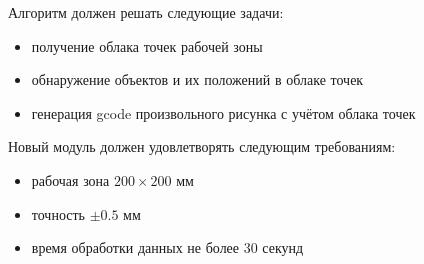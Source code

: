 Алгоритм должен решать следующие задачи:
\begin{itemize}
    \item получение облака точек рабочей зоны
    \item обнаружение объектов и их положений в облаке точек
    \item генерация gcode произвольного рисунка с учётом облака точек
\end{itemize}

Новый модуль должен удовлетворять следующим требованиям:
\begin{itemize}
    \item рабочая зона $ 200 \times 200 \text{ мм}$
    \item точность $ \pm 0.5 \text{ мм} $
    \item время обработки данных не более 30 секунд
\end{itemize}
